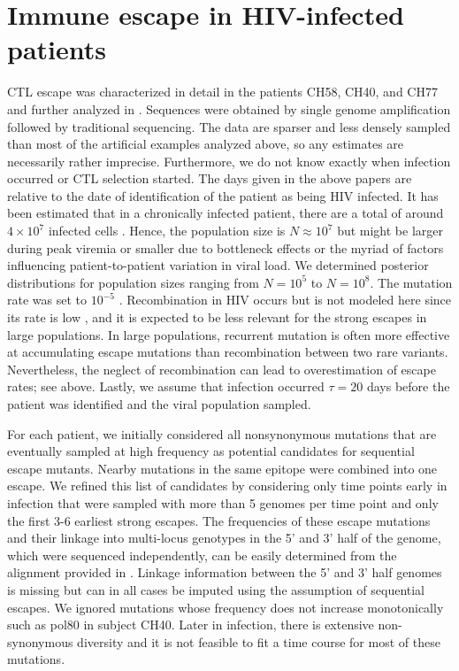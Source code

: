 \documentclass{frontiers}
\begin{document}
\section{Immune escape in HIV-infected patients} 
CTL escape was characterized in detail in the
patients CH58, CH40, and CH77
\citep{SalazarGonzalez:2009p35091,Goonetilleke:2009p42296} and further analyzed
in \citet{ganusov_fitness_2011}. Sequences were obtained by single
genome amplification followed by traditional sequencing.
The data are sparser and less densely sampled than most of the artificial
examples analyzed above, so any estimates are necessarily rather imprecise.
Furthermore, we do not know exactly when infection occurred or CTL selection
started. The days given in the above papers are relative to the date of
identification of the patient as being HIV infected. It has been estimated that
in a chronically infected patient, there are a total of
around $4 \times 10^7$ infected cells \citep{haase_quantitative_1996}. 
Hence, the population size is $N\approx 10^7$  
but might be larger during peak viremia or smaller
due to bottleneck effects or the myriad of factors influencing patient-to-patient
variation in viral load. We determined posterior distributions for
population sizes ranging from $N=10^5$ to $N=10^8$. The mutation rate was set to
$10^{-5}$ \citep{Mansky:1995p38971}. Recombination in HIV occurs but is not
modeled here since its rate is low \citep{Neher:2010p32691,Batorsky:2011p40107},
and it is expected to be less relevant for the strong escapes in large
populations. In large populations, recurrent mutation is often more effective
at accumulating escape mutations than recombination between two rare variants.
Nevertheless, the neglect of recombination can lead to overestimation of escape
rates; see above. Lastly, we assume that infection occurred $\tau=20$ days before
the patient was identified and the viral population sampled.

For each patient, we initially considered all nonsynonymous mutations that are eventually
sampled at high frequency as potential candidates for sequential escape mutants. 
Nearby mutations in the same epitope were combined into one escape. We refined
this list of candidates by considering only time points early in infection that were sampled with
more than 5 genomes per time point and only the first 3-6 earliest strong escapes.
The frequencies of these escape mutations and their linkage into
multi-locus genotypes in the 5' and 3' half of the genome, which were
sequenced independently, can be easily
determined from the alignment provided in
\citet{SalazarGonzalez:2009p35091}. Linkage information between
the 5' and 3' half genomes is missing but can in all cases be imputed
using the assumption of sequential escapes.  We ignored mutations whose frequency
does not increase monotonically such as pol80 in subject CH40.
Later in infection, there is extensive non-synonymous diversity and it is not 
feasible to fit a time course for most of these mutations.
\end{document}
